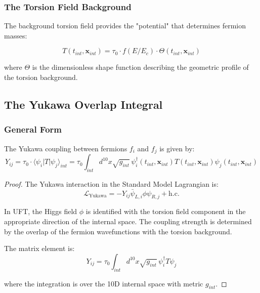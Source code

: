 \subsubsection{The Torsion Field Background}

The background torsion field provides the "potential" that determines fermion masses:

\begin{equation}
    T(t_{int}, \mathbf{x}_{int}) = \tau_0 \cdot f(E/E_c) \cdot \Theta(t_{int}, \mathbf{x}_{int})
\end{equation}

where $\Theta$ is the dimensionless shape function describing the geometric profile of the torsion background.

\subsection{The Yukawa Overlap Integral}

\subsubsection{General Form}

\begin{theorem}
The Yukawa coupling between fermions $f_i$ and $f_j$ is given by:
\begin{equation}
    Y_{ij} = \tau_0 \cdot \langle \psi_i | T | \psi_j \rangle_{int} = \tau_0 \int_{int} d^{10}x \sqrt{g_{int}} \, \psi_i^\dagger(t_{int}, \mathbf{x}_{int}) T(t_{int}, \mathbf{x}_{int}) \psi_j(t_{int}, \mathbf{x}_{int})
\end{equation}
\end{theorem}

\begin{proof}
The Yukawa interaction in the Standard Model Lagrangian is:
\begin{equation}
    \mathcal{L}_{\text{Yukawa}} = -Y_{ij} \bar{\psi}_{L,i} \phi \psi_{R,j} + \text{h.c.}
\end{equation}

In UFT, the Higgs field $\phi$ is identified with the torsion field component in the appropriate direction of the internal space. The coupling strength is determined by the overlap of the fermion wavefunctions with the torsion background.

The matrix element is:
\begin{equation}
    Y_{ij} = \tau_0 \int_{int} d^{10}x \sqrt{g_{int}} \, \psi_i^\dagger T \psi_j
\end{equation}

where the integration is over the 10D internal space with metric $g_{int}$.
\end{proof}

